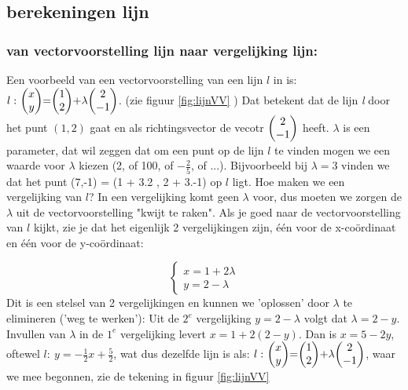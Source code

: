 \documentclass[hidelinks, a4wide, 12pt,  twoside]{book}
\begin{document}

\subsection{berekeningen lijn}

\subsubsection{van vectorvoorstelling lijn naar vergelijking lijn:} 
Een voorbeeld van een  vectorvoorstelling van een lijn $ l $ in \RT  is:
$ l: \ \vectwee {x}{y} = \vectwee {1}{2} + \lambda  \vectwee {2}{-1}  $.   (zie figuur \ref{fig:lijnVV} ) Dat betekent dat de lijn\textit{ l} door het punt $ (1,2) $ gaat en als richtingsvector de vecotr $ \vectwee {2}{-1} $ heeft. $ \lambda $  is een parameter, dat wil zeggen dat om een punt op de lijn $ l $ te vinden mogen we een waarde voor $ \lambda $  kiezen (2, of 100, of $ -\frac{2}{5} $, of ...). Bijvoorbeeld bij  $ \lambda= 3 $ vinden we dat het punt  (7,-1) = (1 + 3.2 , 2 + 3.-1)   op $ l $ ligt. Hoe maken we een vergelijking van  $ l $? In een vergelijking komt geen $ \lambda $ voor, dus moeten we zorgen de $ \lambda $ uit de vectorvoorstelling "kwijt te raken". Als je goed naar de vectorvoorstelling van $ l $ kijkt, zie je dat het eigenlijk 2 vergelijkingen zijn, één voor de x-coördinaat en één voor de y-coördinaat:

\[\begin{cases}
x = 1 + 2\lambda\\
y = 2 - \lambda 
\end{cases}
\] 
Dit is een stelsel van 2 vergelijkingen  en kunnen we 'oplossen' door $ \lambda $ te elimineren ('weg te werken'):
Uit de $ 2^{e}$ vergelijking $ y = 2 - \lambda $ volgt  dat $\lambda = 2 - y $. Invullen van  $ \lambda $ in de $ 1^{e}$ vergelijking levert $ x = 1 +2(2-y) $. Dan is $ x= 5 -2y $, oftewel $ l:  \ y = - \frac{1}{2}x + \frac{5}{2} $,  wat dus dezelfde lijn is als: $ l: \ \vectwee {x}{y} = \vectwee {1}{2} + \lambda  \vectwee {2}{-1}  $, waar we mee begonnen, zie de tekening in  figuur  \ref{fig:lijnVV}
\end{document}
